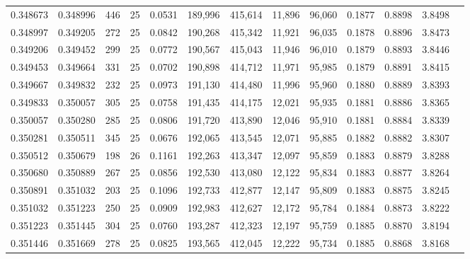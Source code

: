 \begin{tabular}{rrrrrrrrrrrrr}
0.348673 & 0.348996 &   446 &  25 &                                     0.0531 & 189,996 & 415,614 &  11,896 &  96,060 & 0.1877 & 0.8898 & 3.8498 \\
0.348997 & 0.349205 &   272 &  25 &                                     0.0842 & 190,268 & 415,342 &  11,921 &  96,035 & 0.1878 & 0.8896 & 3.8473 \\
0.349206 & 0.349452 &   299 &  25 &                                     0.0772 & 190,567 & 415,043 &  11,946 &  96,010 & 0.1879 & 0.8893 & 3.8446 \\
0.349453 & 0.349664 &   331 &  25 &                                     0.0702 & 190,898 & 414,712 &  11,971 &  95,985 & 0.1879 & 0.8891 & 3.8415 \\
0.349667 & 0.349832 &   232 &  25 &                                     0.0973 & 191,130 & 414,480 &  11,996 &  95,960 & 0.1880 & 0.8889 & 3.8393 \\
0.349833 & 0.350057 &   305 &  25 &                                     0.0758 & 191,435 & 414,175 &  12,021 &  95,935 & 0.1881 & 0.8886 & 3.8365 \\
0.350057 & 0.350280 &   285 &  25 &                                     0.0806 & 191,720 & 413,890 &  12,046 &  95,910 & 0.1881 & 0.8884 & 3.8339 \\
0.350281 & 0.350511 &   345 &  25 &                                     0.0676 & 192,065 & 413,545 &  12,071 &  95,885 & 0.1882 & 0.8882 & 3.8307 \\
0.350512 & 0.350679 &   198 &  26 &                                     0.1161 & 192,263 & 413,347 &  12,097 &  95,859 & 0.1883 & 0.8879 & 3.8288 \\
0.350680 & 0.350889 &   267 &  25 &                                     0.0856 & 192,530 & 413,080 &  12,122 &  95,834 & 0.1883 & 0.8877 & 3.8264 \\
0.350891 & 0.351032 &   203 &  25 &                                     0.1096 & 192,733 & 412,877 &  12,147 &  95,809 & 0.1883 & 0.8875 & 3.8245 \\
0.351032 & 0.351223 &   250 &  25 &                                     0.0909 & 192,983 & 412,627 &  12,172 &  95,784 & 0.1884 & 0.8873 & 3.8222 \\
0.351223 & 0.351445 &   304 &  25 &                                     0.0760 & 193,287 & 412,323 &  12,197 &  95,759 & 0.1885 & 0.8870 & 3.8194 \\
0.351446 & 0.351669 &   278 &  25 &                                     0.0825 & 193,565 & 412,045 &  12,222 &  95,734 & 0.1885 & 0.8868 & 3.8168 \\

\end{tabular}
